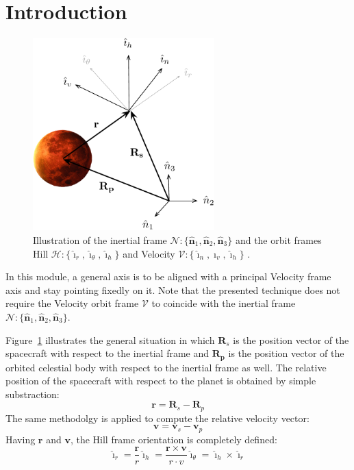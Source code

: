 \documentclass[]{AVSSimReportMemo}
\begin{document}
\section{Introduction}
\begin{figure}[htb]
  \centerline{
  \includegraphics[width=7cm]{Figures/Fig3}
  }
  \caption{Illustration of the inertial frame $\mathcal{N}:\{ \hat{\bm n}_{1}, \hat{\bm n}_{2}, \hat{\bm n}_{3} \}$ and the orbit frames Hill $\mathcal{H}:\{ \hat{\bm\imath}_{r}, \hat{\bm\imath}_{\theta}, \hat{\bm\imath}_{h} \}$ and Velocity $\mathcal{V}:\{ \hat{\bm\imath}_{n}, \hat{\bm\imath}_{v}, \hat{\bm\imath}_{h} \}$ .}
  \label{fig:Fig2}
\end{figure}
In this module, a general axis is to be aligned with a principal Velocity frame axis and stay pointing fixedly on it. Note that the presented technique does not require the Velocity orbit frame $\mathcal{V}$ to coincide with the inertial frame $\mathcal{N}:\{ \hat{\bm n}_{1}, \hat{\bm n}_{2}, \hat{\bm n}_{3} \}$.\par 
Figure~\ref{fig:Fig2} illustrates the general situation in which $\bm{R}_{s}$ is the position vector of the spacecraft with respect to the inertial frame and $\bm{R_{p}}$ is the position vector of the orbited celestial body with respect to the inertial frame as well.
The relative position of the spacecraft with respect to the planet is obtained by simple substraction:
\begin{equation}
  \label{eq:r}
  \bm r = \bm R_{s} -  \bm R_{p}
\end{equation}
The same methodolgy is applied to compute the relative velocity vector:
\begin{equation}
  \label{eq:v}
  \bm v = \bm v_{s} -  \bm v_{p}
\end{equation}
Having $\bm r$ and $\bm v$, the Hill frame orientation is completely defined:
\begin{subequations}
  \begin{equation}
  \hat{\bm\imath}_{r} = \frac{\bm r}{r} 
  \end{equation}
  \begin{equation}
  \hat{\bm\imath}_{h} = \frac{\bm{r}\times{\bm{v}}}{r · v}
  \end{equation}
  \begin{equation}
  \hat{\bm\imath}_{\theta} = \hat{\bm\imath}_{h} \times \hat{\bm\imath}_{r}
  \end{equation}
\end{subequations}
\end{document}
